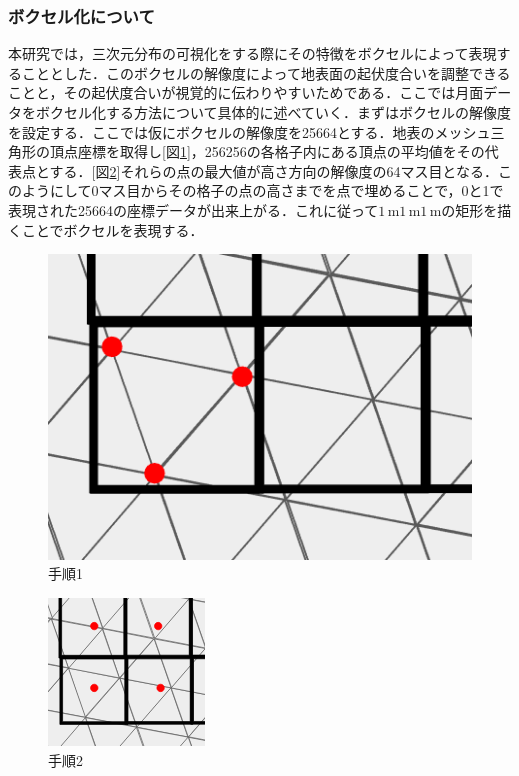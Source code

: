 \subsubsection{ボクセル化について}
本研究では，三次元分布の可視化をする際にその特徴をボクセルによって表現することとした．このボクセルの解像度によって地表面の起伏度合いを調整できることと，その起伏度合いが視覚的に伝わりやすいためである．ここでは月面データをボクセル化する方法について具体的に述べていく．まずはボクセルの解像度を設定する．ここでは仮にボクセルの解像度を256\times64とする．地表のメッシュ三角形の頂点座標を取得し[図\ref{fig:mesh1}]，256\times256の各格子内にある頂点の平均値をその代表点とする．[図\ref{fig:mesh2}]それらの点の最大値が高さ方向の解像度の64マス目となる．このようにして0マス目からその格子の点の高さまでを点で埋めることで，0と1で表現された256\times64の座標データが出来上がる．これに従って$1\mathrm{\,m}$\times$1\mathrm{\,m}$\times$1\mathrm{\,m}$の矩形を描くことでボクセルを表現する．

\begin{figure}[htbp]
    \begin{center}
     \includegraphics[width=0.5\linewidth]{images/mesh1.png}
     \caption{手順1}
     \label{fig:mesh1}
    \end{center}
\end{figure}

\begin{figure}[htbp]
    \begin{center}
     \includegraphics[width=0.5\linewidth]{images/mesh2.png}
     \caption{手順2}
     \label{fig:mesh2}
    \end{center}
\end{figure}


